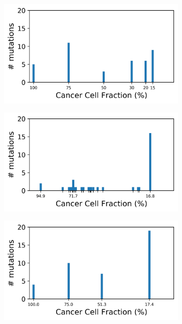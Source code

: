\documentclass{article}
\begin{document}
\begin{figure}[h]
	\centering
	\begin{subfigure}[t]{0.32\linewidth}
		\centering
		\includegraphics[width = 1.0\linewidth, trim={0 0 0 0}, clip=true]{pyclone_analysis_sim50/realcols.png}
		\subcaption{}
	\end{subfigure}%
	\hspace{0.01 \linewidth}
	\begin{subfigure}[t]{0.32\linewidth}
		\centering
		\includegraphics[width = 1.0\linewidth, trim={0 0 0 0}, clip=true]{pyclone_analysis_sim50/cols.png}
		\subcaption{}	
	\end{subfigure}%
	\hspace{0.01 \linewidth}
	\begin{subfigure}[t]{0.32\linewidth}
		\centering
		\includegraphics[width = 1.0\linewidth, trim={0 0 0 0}, clip=true]{ccube_analysis_sim50/cols.png}

\end{subfigure}
\end{figure}
\end{document}
